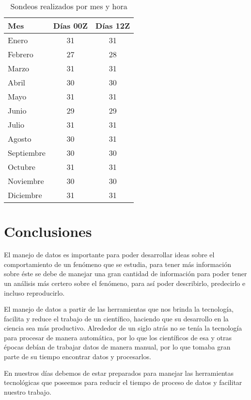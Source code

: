 \documentclass[12pt]{article}
\begin{document}
\begin{table}[h]
\centering
\caption{Sondeos realizados por mes y hora}
\label{fig:somesho}
\begin{tabular}{|l|c|c|}
\textbf{Mes}        & \textbf{Días 00Z} & \textbf{Días 12Z} \\ \midrule
Enero      & 31       & 31       \\
Febrero    & 27       & 28       \\
Marzo      & 31       & 31       \\
Abril      & 30       & 30       \\
Mayo       & 31       & 31       \\
Junio      & 29       & 29       \\
Julio      & 31       & 31       \\
Agosto     & 30       & 31       \\
Septiembre & 30       & 30       \\
Octubre    & 31       & 31       \\
Noviembre  & 30       & 30       \\
Diciembre  & 31       & 31      
\end{tabular}
\end{table}

\section{Conclusiones}
El manejo de datos es importante para poder desarrollar ideas sobre el comportamiento de un fenómeno que se estudia, para tener más información sobre éste se debe de manejar una gran cantidad de información para poder tener un análisis más certero sobre el fenómeno, para así poder describirlo, predecirlo e incluso reproducirlo.

El manejo de datos a partir de las herramientas que nos brinda la tecnología, facilita y reduce el trabajo de un científico, haciendo que su desarrollo en la ciencia sea más productivo. Alrededor de un siglo atrás no se tenía la tecnología para procesar de manera automática, por lo que los científicos de esa y  otras épocas debían de trabajar datos de manera manual, por lo que tomaba gran parte de su tiempo encontrar datos y procesarlos.

En nuestros días debemos de estar preparados para manejar las herramientas tecnológicas que poseemos para reducir el tiempo de proceso de datos y facilitar nuestro trabajo.

\newpage
\end{document}
